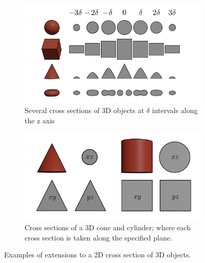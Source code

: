 \documentclass{l4proj}
\begin{document}
\begin{figure}
  \centering
  \begin{subfigure}[b]{0.45\textwidth}
      \includegraphics[width=\textwidth]{images/extensions/timeline-delta.png}
      \caption{Several cross sections of 3D objects at $\delta$ intervals along the z axis}
      \label{fig:exti}
  \end{subfigure}
  \begin{subfigure}[b]{0.45\textwidth}
      \includegraphics[width=\textwidth]{images/extensions/multi-view.png}
      \caption{Cross sections of a 3D cone and cylinder; where each cross section is taken along the specified plane.}
      \label{fig:exmv}
  \end{subfigure}   
  \caption{Examples of extensions to a 2D cross section of 3D objects.
  }\label{fig:extensions}
\end{figure}
\end{document}
